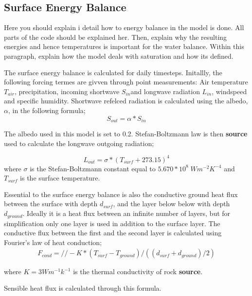 \documentclass[a4paper,11pt,twocolumn]{article}
\begin{document}
\subsection{Surface Energy Balance}
Here you should explain i detail how to energy balance in the model is done. All parts of the code should be explained her. Then, explain why the resulting energies and hence temperatures is important for the water balance. Within this paragraph, explain how the model deals with saturation and how its defined. 

The surface energy balance is calculated for daily timesteps. Initallly, the following forcing termes are givven through point  measurements: Air temperature $T_{air}$, precipitation, incoming shortwave $S_{in} $and longwave radiation $L_{in}$, windspeed and specific humidity.
Shortwave refelced radiation is calculated using the albedo, $\alpha$, in the following formula;
\begin{equation}
	S_{out} = \alpha * S_{in}
\end{equation}

The albedo used in this model is set to 0.2. Stefan-Boltzmann law is then \textbf{source} used to calculate the longwave outgoing radiation;

\begin{equation}
	L_{out} = \sigma * (T_{surf}+273.15)^4
\end{equation}
where $\sigma$ is the Stefan-Boltzmann constant equal to $5.670*10^8 \; Wm^{-2}K^{-4}$ and $T_{surf}$ is the surface temperature. 

Essential to the surface energy balance is also the conductive ground heat flux between the surface with depth $d_{surf}$, and the layer below below with depth $d_{ground}$. Ideally it is a heat flux between an infinite number of layers, but for simplification only one layer is used in addition to the surface layer. The conductive flux between the first and the second layer is calculated using Fourier's law of heat conduction;
\begin{equation}
\begin{multlined}
F_{cond} = //
-K*(T_{surf}-T_{ground})/((d_{surf}+d_{ground})/2)
\end{multlined}
\end{equation}
	
where $K = 3 Wm^{-1}k^{-1}$ is the thermal conductivity of rock \textbf{source}. 

Sensible heat flux is calculated through
this formula. 
\end{document}
